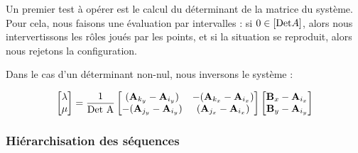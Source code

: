 Un premier test \`a op\'erer est le calcul du d\'eterminant de la matrice du 
syst\`eme. Pour cela, nous faisons une \'evaluation par intervalles : si $0 \in 
[\hbox{Det}A]$, alors nous intervertissons les r\^oles jou\'es par les points, 
et si la situation se reproduit, alors nous rejetons la configuration.

Dans le cas d'un d\'eterminant non-nul, nous inversons le syst\`eme :

\begin{equation}
\begin{bmatrix}
\lambda \\
\mu
\end{bmatrix} = \frac 1 {\hbox{Det A}}
\begin{bmatrix}
({\bf A}_{k_y} - {\bf A}_{i_y}) & -({\bf A}_{k_x} 
- {\bf A}_{i_x}) \\
-({\bf A}_{j_y} - {\bf A}_{i_y}) & ({\bf A}_{j_x} - {\bf A}_{i_x}) 
\end{bmatrix}
\begin{bmatrix}
{\bf B}_{x} - {\bf A}_{i_x} \\
{\bf B}_{y} - {\bf A}_{i_y}
\end{bmatrix}
\label{chap01:eq19}
\end{equation}

\subsubsection{Hi\'erarchisation des s\'equences}

